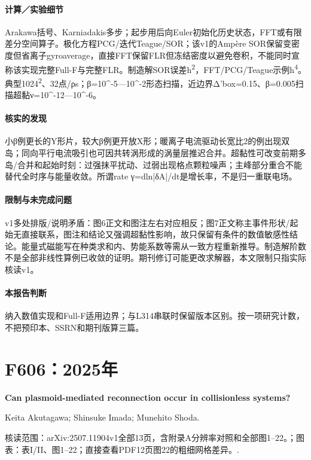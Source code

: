 \documentclass[UTF8,a4paper,11pt,openany,fontset=fandol]{ctexbook}
\begin{document}
\paragraph{计算／实验细节}Arakawa括号、Karniadakis多步；起步用后向Euler初始化历史状态，FFT或有限差分空间算子。极化方程PCG/迭代Teague/SOR；该v1的Ampère SOR保留变密度但省离子gyroaverage，直接FFT保留FLR但冻结密度以避免卷积，不能同时宣称该实现完整Full-F与完整FLR。制造解SOR误差h\textsuperscript{2}，FFT/PCG/Teague示例h\textsuperscript{4}。典型1024\textsuperscript{2}、32点/ρs；β=10\textasciicircum{}-5—10\textasciicircum{}-2形态扫描，近边界Δ'box=0.15、β=0.005扫描超黏ν=10\textasciicircum{}-12—10\textasciicircum{}-6。

\paragraph{核实的发现}小β例更长的Y形片，较大β例更开放X形；暖离子电流驱动长宽比2的例出现双岛；同向平行电流吸引也可因共转涡形成的涡量层推迟合并。超黏性可改变前期多岛/合并和起始时刻：过强抹平扰动、过弱出现格点颗粒噪声；主峰部分重合不能替代全时序与能量收敛。所谓rate γ=dln|δA|/dt是增长率，不是归一重联电场。

\paragraph{限制与未完成问题}v1多处排版/说明矛盾：图6正文和图注左右对应相反；图7正文称主事件形状/起始无直接联系，图注和结论又强调超黏性影响，故只保留有条件的数值敏感性结论。能量式磁能写在种类求和内、势能系数等需从一致方程重新推导。制造解阶数不是全部非线性算例已收敛的证明。期刊修订可能更改求解器，本文限制只指实际核读v1。

\paragraph{本报告判断}纳入数值实现和Full-F适用边界；与L314串联时保留版本区别。按一项研究计数，不把预印本、SSRN和期刊版算三篇。

\section{F606：2025年}\label{paper:F606}

\textbf{Can plasmoid-mediated reconnection occur in collisionless systems?}\citep{F606}\

Keita Akutagawa;  Shinsuke Imada;  Munehito Shoda.

\textsf{核读范围：}arXiv:2507.11904v1全部13页，含附录A分辨率对照和全部图1–22。；\textsf{图表：}表I/II、图1–22；直接查看PDF12页图22的粗细网格差异。.
\end{document}

